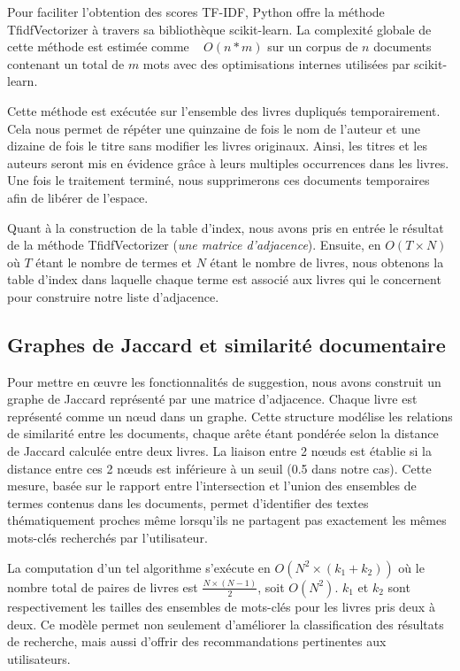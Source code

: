 \documentclass{article}
\begin{document}
    Pour faciliter l’obtention des scores TF-IDF, Python offre la méthode TfidfVectorizer à travers sa bibliothèque scikit-learn\cite{scikitlearn}. La complexité globale de cette méthode est estimée comme ~ $O(n*m)$ sur un corpus de $n$ documents contenant un total de $m$ mots avec des optimisations internes utilisées par scikit-learn. 
    
    Cette méthode est exécutée sur l’ensemble des livres dupliqués temporairement. Cela nous permet de répéter une quinzaine de fois le nom de l’auteur et une dizaine de fois le titre sans modifier les livres originaux. Ainsi, les titres et les auteurs seront mis en évidence grâce à leurs multiples occurrences dans les livres. Une fois le traitement terminé, nous supprimerons ces documents temporaires afin de libérer de l’espace.

    Quant à la construction de la table d’index, nous avons pris en entrée le résultat de la méthode TfidfVectorizer (\textit{une matrice d'adjacence}). Ensuite, en $O(T \times N)$ où $T$ étant le nombre de termes et $N$ étant le nombre de livres, nous obtenons la table d’index dans laquelle chaque terme est associé aux livres qui le concernent\cite{coursrechercheinfo} pour construire notre liste d’adjacence.

    \subsection{Graphes de Jaccard et similarité documentaire}
    Pour mettre en œuvre les fonctionnalités de suggestion, nous avons construit un graphe de Jaccard représenté par une matrice d'adjacence. Chaque livre est représenté comme un nœud dans un graphe. Cette structure modélise les relations de similarité entre les documents, chaque arête étant pondérée selon la distance de Jaccard calculée entre deux livres. La liaison entre 2 nœuds est établie si la distance entre ces 2 nœuds est inférieure à un seuil (0.5 dans notre cas). Cette mesure, basée sur le rapport entre l'intersection et l'union des ensembles de termes contenus dans les documents, permet d'identifier des textes thématiquement proches même lorsqu'ils ne partagent pas exactement les mêmes mots-clés recherchés par l'utilisateur. 

    La computation d’un tel algorithme s’exécute en $O(N^2 \times (k_1 + k_2))$ où le nombre total de paires de livres est $\frac{N \times (N-1)}{2}$, soit $O(N^2)$.  $k_1$ et $k_2$ sont respectivement les tailles des ensembles de mots-clés pour les livres pris deux à deux.
    Ce modèle permet non seulement d’améliorer la classification des résultats de recherche, mais aussi d’offrir des recommandations pertinentes aux utilisateurs.
\end{document}
